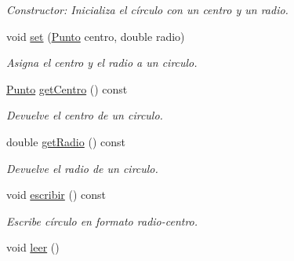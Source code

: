 \begin{DoxyCompactItemize}
\begin{DoxyCompactList}\small\item\em Constructor\+: Inicializa el círculo con un centro y un radio. \end{DoxyCompactList}\item 
void \hyperlink{classCirculo_aa24cc4b316a3d9ece35f120d9b8e1fc4}{set} (\hyperlink{classPunto}{Punto} centro, double radio)\hypertarget{classCirculo_aa24cc4b316a3d9ece35f120d9b8e1fc4}{}\label{classCirculo_aa24cc4b316a3d9ece35f120d9b8e1fc4}

\begin{DoxyCompactList}\small\item\em Asigna el centro y el radio a un circulo. \end{DoxyCompactList}\item 
\hyperlink{classPunto}{Punto} \hyperlink{classCirculo_a022cde4d10d14a47a3b3921f80909f3b}{get\+Centro} () const \hypertarget{classCirculo_a022cde4d10d14a47a3b3921f80909f3b}{}\label{classCirculo_a022cde4d10d14a47a3b3921f80909f3b}

\begin{DoxyCompactList}\small\item\em Devuelve el centro de un circulo. \end{DoxyCompactList}\item 
double \hyperlink{classCirculo_a982f8a785d8a68ab1483b609cd752980}{get\+Radio} () const \hypertarget{classCirculo_a982f8a785d8a68ab1483b609cd752980}{}\label{classCirculo_a982f8a785d8a68ab1483b609cd752980}

\begin{DoxyCompactList}\small\item\em Devuelve el radio de un circulo. \end{DoxyCompactList}\item 
void \hyperlink{classCirculo_a2deaed49ea394702beb0554f9480137e}{escribir} () const \hypertarget{classCirculo_a2deaed49ea394702beb0554f9480137e}{}\label{classCirculo_a2deaed49ea394702beb0554f9480137e}

\begin{DoxyCompactList}\small\item\em Escribe círculo en formato radio-\/centro. \end{DoxyCompactList}\item 
void \hyperlink{classCirculo_aa71efffb3b42eeaefd43743a8d34aa74}{leer} ()\hypertarget{classCirculo_aa71efffb3b42eeaefd43743a8d34aa74}{}\label{classCirculo_aa71efffb3b42eeaefd43743a8d34aa74}


\end{DoxyCompactItemize}
